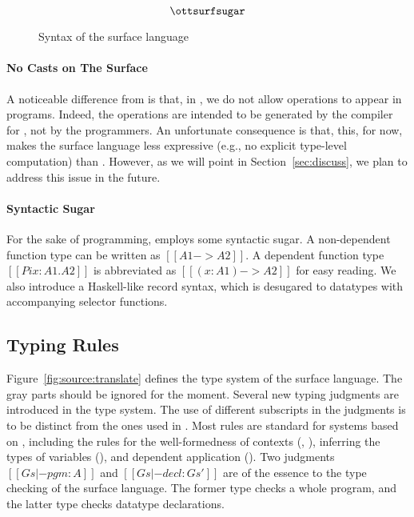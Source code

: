 \begin{figure*}
\centering
\gram{\ottpgm\ottinterrule
\ottdecl\ottinterrule
\ottu\ottinterrule
\ottp\ottinterrule
\ottE\ottinterrule
\ottGs}
\[\ottsurfsugar\] %
\caption{Syntax of the surface language}
\label{fig:surface:syntax}
\end{figure*}

\paragraph{No Casts on The Surface}
A noticeable difference from \name is that, in \sufcc, we do not allow
\cast operations to appear in programs. Indeed, the \cast
operations are intended to be generated by the compiler for \name, not
by the programmers. An unfortunate consequence is that, this, for now,
makes the surface language less expressive (e.g., no explicit
type-level computation) than \name. However, as we will point in
Section~\ref{sec:discuss}, we plan to address this issue in the future.

\paragraph{Syntactic Sugar}
For the sake of programming, \sufcc employs some syntactic sugar. A
non-dependent function type can be written as $[[A1 -> A2]]$. A
dependent function type $[[Pi x : A1 . A2]]$ is abbreviated as
$[[(x : A1) -> A2]]$ for easy reading. We also introduce a
Haskell-like record syntax, which is desugared to datatypes with
accompanying selector functions.


\subsection{Typing Rules}
Figure~\ref{fig:source:translate} defines the type system of the
surface language. The gray parts should be ignored for the moment. Several new
typing judgments are introduced in the type system. The use of
different subscripts in the judgments is to be distinct from the ones
used in \name. Most rules are standard for systems based on \coc,
including the rules for the well-formedness of contexts
(, ), inferring the types of
variables (), and dependent application
(). Two judgments $[[Gs |- pgm : A]]$ and
$[[Gs |- decl : Gs']]$ are of the essence to the type checking of the
surface language. The former type checks a whole program, and the
latter type checks datatype declarations.

